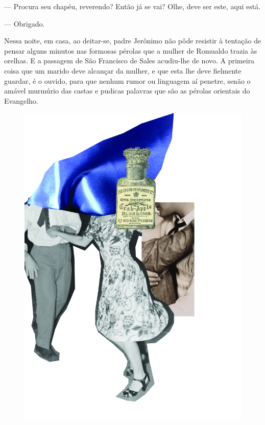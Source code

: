 --- Procura seu chapéu, reverendo? Então já se vai? Olhe, deve ser este,
aqui está.

--- Obrigado.

Nessa noite, em casa, ao deitar-se, padre Jerônimo não pôde resistir à
tentação de pensar alguns minutos nas formosas pérolas que a mulher de
Romualdo trazia às orelhas. E a passagem de São Francisco de Sales
acudiu-lhe de novo. A primeira coisa que um marido deve alcançar da
mulher, e que esta lhe deve fielmente guardar, é o ouvido, para que
nenhum rumor ou linguagem aí penetre, senão o amável murmúrio das castas
e pudicas palavras que são as pérolas orientais do Evangelho.

\pagebreak
\thispagestyle{empty}
\begin{figure}
\includegraphics[width=\textwidth]{./ilustracoes/12_UTIL.jpg}
\end{figure}
\pagebreak

